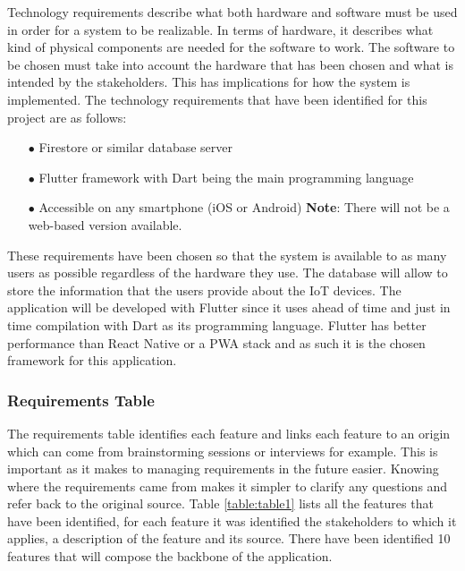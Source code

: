 Technology requirements describe what both hardware and software must be
used in order for a system to be realizable. In terms of hardware, it describes
what kind of physical components are needed for the software to work. The
software to be chosen must take into account the hardware that has been
chosen and what is intended by the stakeholders. This has implications for
how the system is implemented.
\newline
The technology requirements that have been identified for this project are as follows:
\begin{itemize}
    \item[$\bullet$] Firestore or similar database server
    \item[$\bullet$] Flutter framework with Dart being the main programming language
    \item[$\bullet$] Accessible on any smartphone (iOS or Android) \newline \textbf{Note}: There will not be a web-based version available.
\end{itemize}
These requirements have been chosen so that the system is available to as
many users as possible regardless of the hardware they use. The database
will allow to store the information that the users provide about the IoT
devices. The application will be developed with Flutter since it uses ahead
of time and just in time compilation with Dart as its programming language.
Flutter has better performance than React Native or a PWA stack and as such it is the chosen framework for
this application.

\subsubsection{Requirements Table}

The requirements table identifies each feature and links each feature to an origin
which can come from brainstorming sessions or interviews for example.
This is important as it makes to managing requirements in the future easier.
Knowing where the requirements came from makes it simpler to clarify any questions
and refer back to the original source.
\newline
Table \ref{table:table1} lists all the features that have been identified, for
each feature it was identified the stakeholders to which it applies, a description
of the feature and its source. There have been identified 10 features that will
compose the backbone of the application.

